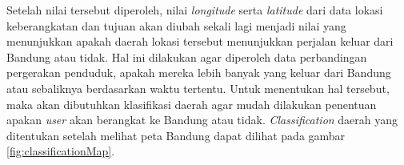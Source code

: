 \begin{center}
\begin{table}
\rotatebox{90}{%
\begin{tabular}{|l|l|l|l|l|l|p{2.5cm}|p{2.5cm}|p{2.5cm}|p{2.5cm}|}
\hline
\textbf{Tanggal}	& \textbf{Bulan}	& \textbf{Tahun} 	& \textbf{Hari} & \textbf{Jam}	& \textbf{Menit} & \textbf{Latitude Keberangkatan} & \textbf{Longitude Keberangkatan} & \textbf{Latitude Tujuan} & \textbf{Longitude Tujuan}      \\ \hline
01				         	& 02								& 2014						& Sabtu         & 00         	& 11						 & -6.8972513										 & 107.6185574 							  & -6.91358                & 107.62718 \\ \hline
01				         	& 02								& 2014						& Sabtu         & 00         	& 13						 & -6.8972513										 & 107.6385574                & -6.91358							  & 107.62718 \\ \hline
01				          & 02								& 2014						& Sabtu         & 00         	& 16						 & -6.90598											 & 107.59714     		  				& -6.90855						&107.61082 \\ \hline
01				          & 02								& 2014						& Sabtu         & 00         	& 18						 & -6.9015366										 & 107.5414474 								& -6.88574					    & 107.53816 \\ \hline
01				          & 02								& 2014						& Sabtu         & 00         	& 25						 & -6.90608										   & 107.61530     						  & -6.89140					 &107.61060 \\ \hline
01				          & 02								& 2014						& Sabtu         & 00         	& 27						 & -6.89459											 & 107.58818     							& -6.89876						&107.60886 \\ \hline
01				          & 02								& 2014						& Sabtu         & 00         	& 28						 & -6.89459											 &107.58818  								   & -6.86031					 &107.61287 \\ \hline
\end{tabular}%
}
\caption{Contoh hasil data transformasi}
\label{table:contohHasilDataTransformasi}
\end{table}
\end{center}

Setelah nilai tersebut diperoleh, nilai \textsl{longitude} serta \textsl{latitude} dari data lokasi keberangkatan dan tujuan akan diubah sekali lagi menjadi nilai yang menunjukkan apakah daerah lokasi tersebut menunjukkan perjalan keluar dari Bandung atau tidak. Hal ini dilakukan agar diperoleh data perbandingan pergerakan penduduk, apakah mereka lebih banyak yang keluar dari Bandung atau sebaliknya berdasarkan waktu tertentu. Untuk menentukan hal tersebut, maka akan dibutuhkan klasifikasi daerah agar mudah dilakukan penentuan apakan \textsl{user} akan berangkat ke Bandung atau tidak. \textsl{Classification} daerah yang ditentukan setelah melihat peta Bandung dapat dilihat pada gambar \ref{fig:classificationMap}.

